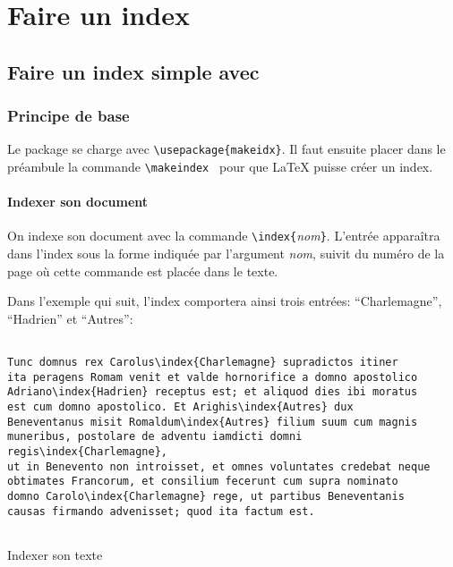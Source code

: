 
\chapter{Faire un index}


\section{Faire un index simple avec }


\subsection{Principe de base}
\begin{prealable}
Le package se charge avec \verb|\usepackage{makeidx}|. Il faut ensuite placer dans le préambule la commande \verb|\makeindex | pour que \LaTeX{}  puisse créer un index.
\end{prealable}



\subsubsection{Indexer son document}


On indexe son document avec  la commande \verb+\index{+\emph{nom}\verb+}+. L'entrée apparaîtra dans l'index sous la forme indiquée par l'argument \emph{nom}, suivit du numéro de la page où cette commande est placée dans le texte. 

Dans l'exemple qui suit, l'index comportera ainsi trois entrées: \enquote{Charlemagne}, \enquote{Hadrien} et \enquote{Autres}:

\begin{listing}[ht]
\begin{verbatim}

Tunc domnus rex Carolus\index{Charlemagne} supradictos itiner 
ita peragens Romam venit et valde hornorifice a domno apostolico
Adriano\index{Hadrien} receptus est; et aliquod dies ibi moratus
est cum domno apostolico. Et Arighis\index{Autres} dux
Beneventanus misit Romaldum\index{Autres} filium suum cum magnis
muneribus, postolare de adventu iamdicti domni regis\index{Charlemagne},
ut in Benevento non introisset, et omnes voluntates credebat neque 
obtimates Francorum, et consilium fecerunt cum supra nominato 
domno Carolo\index{Charlemagne} rege, ut partibus Beneventanis
causas firmando advenisset; quod ita factum est. 


\end{verbatim}
\caption{Indexer son texte}
\end{listing}

